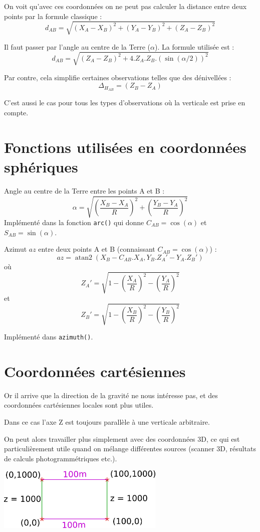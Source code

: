 \documentclass[french]{report}
\DeclareMathOperator{\atantwo}{atan2}
\begin{document}
On voit qu'avec ces coordonnées on ne peut pas calculer la distance entre deux points par la formule classique :
$$d_{AB} = \sqrt{(X_A-X_B)^2+(Y_A-Y_B)^2+(Z_A-Z_B)^2}$$


Il faut passer par l'angle
au centre de la Terre ($\alpha$). La formule utilisée est :
$$ d_{AB}  = \sqrt{(Z_A-Z_B)^2+4 . Z_A .Z_B . (\sin(\alpha/2))^2} $$

Par contre, cela simplifie certaines observations telles que des dénivellées :
$$ \Delta_{H_{AB}}  = (Z_B-Z_A) $$

C'est aussi le cas pour tous les types d'observations où la verticale est prise en compte.

\section{Fonctions utilisées en coordonnées sphériques}

Angle au centre de la Terre entre les points A et B :
$$\alpha=  \sqrt{ \left(\frac{X_B-X_A}{R}\right)^2 + \left(\frac{Y_B-Y_A}{R}\right)^2 }$$
Implémenté dans la fonction
\texttt{arc()}
qui donne $C_{AB} = \cos(\alpha)$  et $S_{AB} = \sin(\alpha)$.

Azimut $az$ entre deux points A et B (connaissant $C_{AB}=\cos(\alpha)$) :
$$ az = \atantwo(X_B-C_{AB}.X_A,Y_B.Z_A'-Y_A.Z_B')$$
où $$ Z_A' = \sqrt{1-\left(\frac{X_A}{R}\right)^2-\left(\frac{Y_A}{R}\right)^2}$$
et $$ Z_B' = \sqrt{1-\left(\frac{X_B}{R}\right)^2-\left(\frac{Y_B}{R}\right)^2}$$

Implémenté dans \texttt{azimuth()}.

\section{Coordonnées cartésiennes}\label{cartesiennes}

Or il arrive que la direction de la gravité ne nous intéresse pas, et des coordonnées cartésiennes locales sont plus utiles.

Dans ce cas l'axe Z est toujours parallèle à une verticale arbitraire.

On peut alors travailler plus simplement avec des coordonnées 3D, ce qui est particulièrement utile quand on mélange différentes
sources (scanner 3D, résultats de calculs photogrammétriques etc.).

\begin{center}
\includegraphics[width = 8cm]{images/coord_cart}
\end{center}
\end{document}
